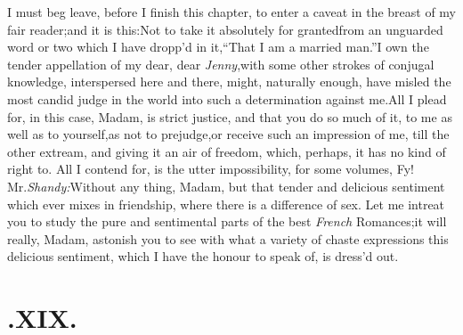 \documentclass{article}
\begin{document}
I must beg leave, before I finish this chapter, to enter a
caveat in the breast of my fair reader;\tsk  and it is
this:\tsh\break  Not to take it absolutely for granted\break from an
unguarded word or two which I have dropp’d in
it,\tsh  “That I am a married
man.”\tsk  I own the tender appel\-lation of my dear, dear
\textit{Jenny},\tsk  with some other strokes of conjugal know\-ledge,
interspersed here and there, might, naturally enough, have misled
the most candid judge in the world into such a determination
against me.\tsk  All I plead for, in this case, Madam, is strict
justice, and that you do so much of it, to me as well as to
yourself,\tsk  as not to prejudge,\break or receive such an impression
of me, till
the other
extream, and giving it an air of freedom, which, perhaps, it has no
kind of right to. All I contend for, is the utter impossibility,
for some volumes, 
Fy! Mr.\@ \textit{Shandy:}\tsk  Without
any thing, Madam, but that tender and delicious sentiment which
ever mixes in friendship, where there is a difference of sex. Let
me intreat you to study the pure and sentimental parts of the best
\textit{French} Romances;\tsk  it will really, Madam, astonish you
to see with what a variety of chaste expressions this delicious
sentiment, which I have the honour to speak of, is dress’d
out.

\section{.\enspace XIX.}
\end{document}
